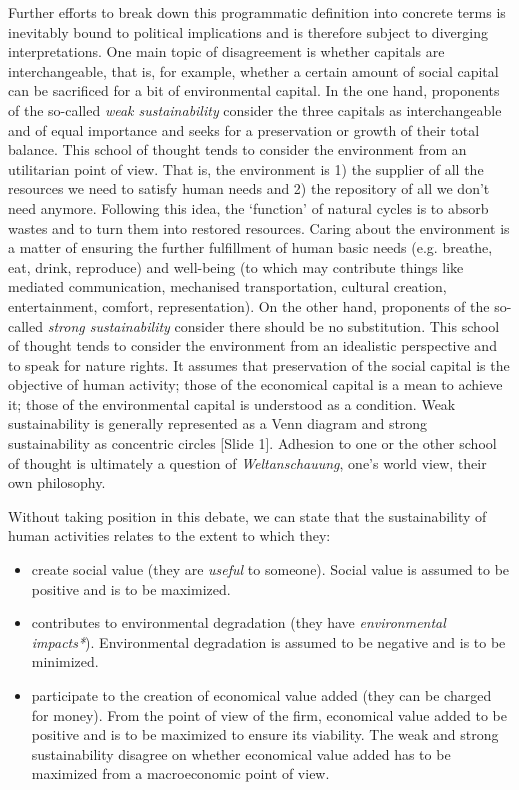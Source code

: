 \documentclass{article}
\begin{document}
Further efforts to break down this programmatic definition into concrete terms is inevitably bound to political implications and is therefore subject to diverging interpretations. One main topic of disagreement is whether capitals are interchangeable, that is, for example, whether a certain amount of social capital can be sacrificed for a bit of environmental capital. In the one hand, proponents of the so-called \emph{weak sustainability} consider the three capitals as interchangeable and of equal importance and seeks for a preservation or growth of their total balance. This school of thought tends to consider the environment from an utilitarian point of view. That is, the environment is 1) the supplier of all the resources we need to satisfy human needs and 2) the repository of all we don't need anymore. Following this idea, the `function' of natural cycles is to absorb wastes and to turn them into restored resources. Caring about the environment is a matter of ensuring the further fulfillment of human basic needs (e.g. breathe, eat, drink, reproduce) and well-being (to which may contribute things like mediated communication, mechanised transportation, cultural creation, entertainment, comfort, representation). On the other hand, proponents of the so-called \emph{strong sustainability} consider there should be no substitution. This school of thought tends to consider the environment from an idealistic perspective and to speak for nature rights. It assumes that preservation of the social capital is the objective of human activity; those of the economical capital is a mean to achieve it; those of the environmental capital is understood as a condition. Weak sustainability is generally represented as a Venn diagram and strong sustainability as concentric circles {\color{blue}[Slide 1]}. Adhesion to one or the other school of thought is ultimately a question of \emph{Weltanschauung}, one's world view, their own philosophy.

Without taking position in this debate, we can state that the sustainability of human activities relates to the extent to which they:
\begin{itemize}
	\item create social value (they are \emph{useful} to someone). Social value is assumed to be positive and is to be maximized. 
	\item contributes to environmental degradation (they have \emph{environmental impacts*}). Environmental degradation is assumed to be negative and is to be minimized.
	\item participate to the creation of economical value added (they can be charged for money). From the point of view of the firm, economical value added to be positive and is to be maximized to ensure its viability. The weak and strong sustainability disagree on whether economical value added has to be maximized from a macroeconomic point of view.
\end{itemize}
\end{document}
